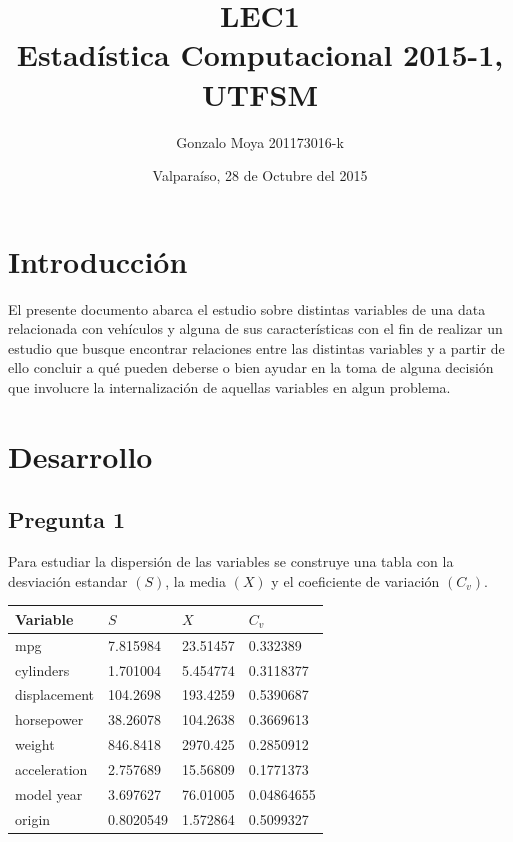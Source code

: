 \documentclass[letter,10pt]{article}
\title{LEC1 \\ Estadística Computacional 2015-1, UTFSM }
\author{Gonzalo Moya 201173016-k}
\date{\vspace*{1cm} Valparaíso, 28 de Octubre del 2015}
\begin{document}
\maketitle
\thispagestyle{empty}
\newpage
\tableofcontents

\makeatother

\newpage

\section{Introducción}
El presente documento abarca el estudio sobre distintas variables de una data relacionada con vehículos y alguna de sus características con el fin de realizar 
un estudio que busque encontrar relaciones entre las distintas variables y a partir de ello concluir a qué pueden deberse o bien ayudar en la toma de alguna decisión 
que involucre la internalización de aquellas variables en algun problema.

\section{Desarrollo}
\subsection{Pregunta 1}

Para estudiar la dispersión de las variables se construye una tabla con la desviación estandar $(S)$, la media $(X)$ y el coeficiente
de variación $(C_v)$.

\begin{table}[h]
    \begin{center}
    \begin{tabular}{|l|l|l|l|}
    \hline
    Variable     & $S$ & $X$ & $C_{v}$ \\ \hline
    mpg          & 7.815984 & 23.51457 & 0.332389 \\
    cylinders    & 1.701004 & 5.454774 & 0.3118377 \\
    displacement & 104.2698 & 193.4259 & 0.5390687 \\
    horsepower   & 38.26078 & 104.2638 & 0.3669613 \\
    weight       & 846.8418 & 2970.425 & 0.2850912 \\
    acceleration & 2.757689 & 15.56809 & 0.1771373 \\
    model year   & 3.697627 & 76.01005 & 0.04864655 \\
    origin       & 0.8020549 & 1.572864 & 0.5099327 \\ \hline
    \end{tabular}
    \end{center}
\end{table}
\end{document}
